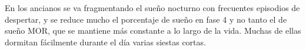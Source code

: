En los ancianos se va fragmentando el sue\~no nocturno con frecuentes episodios de despertar, y se 
reduce mucho el porcentaje de sue\~no en fase 4 y no tanto el de sue\~no MOR, que se mantiene 
m\'as constante a lo largo de la vida. 
Muchas de ellas dormitan f\'acilmente durante el d\'ia varias siestas cortas.


%
 

%
%



